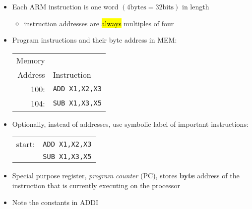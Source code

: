 \begin{frame}[fragile]
\begin{itemize}
 \item Each ARM instruction is one word $(4 \text{bytes} = 32 \text{bits})$ in length
\begin{itemize}
    \item instruction addresses are \hl{always} multiples of four
\end{itemize}
 
 \item Program instructions and their byte address in MEM:
\begin{center}
\begin{tabular}{rl}
Memory& \\
Address & Instruction\\\hline
100: &\texttt{ADD X1,X2,X3}\\
104: &\texttt{SUB X1,X3,X5}\\
\end{tabular}
\end{center}
\item Optionally, instead of addresses, use symbolic label of important instructions:
\begin{center}
\begin{tabular}{rl}
start: &\texttt{ADD X1,X2,X3}\\
&\texttt{SUB X1,X3,X5}\\
\end{tabular}
\end{center}
\item Special purpose register, {\em program counter} (PC), stores \textbf{byte}
   address of the instruction that is currently executing on the processor 
\end{itemize}
\BNotes\ifnum{}
\begin{itemize}
 \item Note the constants in ADDI
 \end{itemize}
\fi\ENotes
\end{frame}

